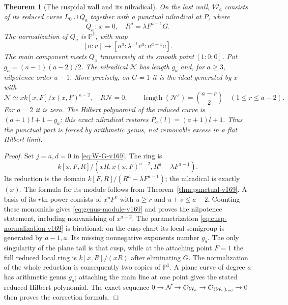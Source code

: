 \documentclass[11pt,reqno]{amsart}
\numberwithin{equation}{section}
\newtheorem{theorem}{Theorem}[section]
\theoremstyle{definition}\newtheorem{definition}[theorem]{Definition}
\theoremstyle{remark}\newtheorem{remark}[theorem]{Remark}
\newcommand{\Pj}{\mathbb P}\newcommand{\A}{\mathbb A}
\newcommand{\OO}{\mathcal O}\newcommand{\II}{\mathcal I}
\DeclareMathOperator{\length}{length}
\begin{document}
\begin{theorem}[The cuspidal wall and its nilradical]\label{thm:genus-correction-v169}
On the last wall, $\mathcal W_a$ consists of its reduced curve
$L_0\cup Q_a$ together with a punctual nilradical at $P$, where
\[
 Q_a:\ x=0,\quad R^a=\lambda F^{a-1}G.
\]
The normalization of $Q_a$ is $\Pj^1$, with map
\begin{equation}\label{eq:cusp-normalization-v169}
 [u:v]\longmapsto[u^a:\lambda^{-1}v^a:u^{a-1}v].
\end{equation}
The main component meets $Q_a$ transversely at its smooth point
$[1:0:0]$. Put $g_a=(a-1)(a-2)/2$. The nilradical $\mathcal N$ has
length $g_a$ and, for $a\geq3$, nilpotence order $a-1$. More precisely,
on $G=1$ it is the ideal generated by $x$ with
\begin{equation}\label{eq:genus-module-v169}
 \mathcal N\simeq xk[x,F]/x(x,F)^{a-2},\quad R\mathcal N=0,
 \qquad
 \length(\mathcal N^r)=\binom{a-r}{2}\quad(1\leq r\leq a-2).
\end{equation}
For $a=2$ it is zero. The Hilbert polynomial of the reduced curve is
$(a+1)l+1-g_a$; this exact nilradical restores $P_a(l)=(a+1)l+1$.
Thus the punctual part is forced by arithmetic genus, not removable
excess in a flat Hilbert limit.
\end{theorem}
\begin{proof}
Set $j=a,d=0$ in \eqref{eq:W-G-v169}. The ring is
\[
 k[x,F,R]/(xR,x(x,F)^{a-2},R^a-\lambda F^{a-1}).
\]
Its reduction is the domain $k[F,R]/(R^a-\lambda F^{a-1})$; the
nilradical is exactly $(x)$. The formula for its module follows from
Theorem~\ref{thm:punctual-v169}. A basis of its $r$th power consists
of $x^uF^v$ with $u\geq r$ and $u+v\leq a-2$. Counting these
monomials gives \eqref{eq:genus-module-v169} and proves the
nilpotence statement, including nonvanishing of $x^{a-2}$.
The parametrization \eqref{eq:cusp-normalization-v169} is birational;
on the cusp chart its local semigroup is generated by $a-1,a$.
Its missing nonnegative exponents number $g_a$. The only singularity
of the plane tail is that cusp, while at the attaching point $F=1$
the full reduced local ring is $k[x,R]/(xR)$ after eliminating $G$.
The normalization of the whole reduction is consequently two copies
of $\Pj^1$. A plane curve of degree $a$ has arithmetic genus $g_a$;
attaching the main line at one point gives the stated reduced Hilbert
polynomial. The exact sequence
$0\to\mathcal N\to\OO_{\mathcal W_a}\to\OO_{(\mathcal W_a)_{\rm red}}\to0$
then proves the correction formula.
\end{proof}
\end{document}

